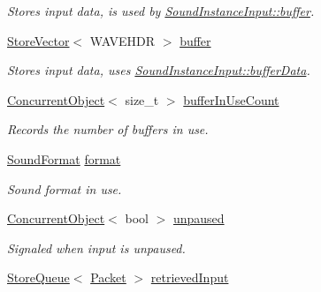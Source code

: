 \begin{DoxyCompactItemize}
\begin{DoxyCompactList}\small\item\em Stores input data, is used by \hyperlink{class_sound_instance_input_a07337eba668678c1483c679b8a702ab6}{SoundInstanceInput::buffer}. \item\end{DoxyCompactList}\item 
\hypertarget{class_sound_instance_input_a07337eba668678c1483c679b8a702ab6}{
\hyperlink{class_store_vector}{StoreVector}$<$ WAVEHDR $>$ \hyperlink{class_sound_instance_input_a07337eba668678c1483c679b8a702ab6}{buffer}}
\label{class_sound_instance_input_a07337eba668678c1483c679b8a702ab6}

\begin{DoxyCompactList}\small\item\em Stores input data, uses \hyperlink{class_sound_instance_input_a19cd80335b30e8eb06278725d10aa316}{SoundInstanceInput::bufferData}. \item\end{DoxyCompactList}\item 
\hyperlink{class_concurrent_object}{ConcurrentObject}$<$ size\_\-t $>$ \hyperlink{class_sound_instance_input_a6941c252472e5f25c8761d6850a95658}{bufferInUseCount}
\begin{DoxyCompactList}\small\item\em Records the number of buffers in use. \item\end{DoxyCompactList}\item 
\hypertarget{class_sound_instance_input_ab28bbe2734e18d0a3f6d9f65362efd78}{
\hyperlink{class_sound_format}{SoundFormat} \hyperlink{class_sound_instance_input_ab28bbe2734e18d0a3f6d9f65362efd78}{format}}
\label{class_sound_instance_input_ab28bbe2734e18d0a3f6d9f65362efd78}

\begin{DoxyCompactList}\small\item\em Sound format in use. \item\end{DoxyCompactList}\item 
\hypertarget{class_sound_instance_input_ae3aaba9fa3a2dfdfed79bd068bb2217a}{
\hyperlink{class_concurrent_object}{ConcurrentObject}$<$ bool $>$ \hyperlink{class_sound_instance_input_ae3aaba9fa3a2dfdfed79bd068bb2217a}{unpaused}}
\label{class_sound_instance_input_ae3aaba9fa3a2dfdfed79bd068bb2217a}

\begin{DoxyCompactList}\small\item\em Signaled when input is unpaused. \item\end{DoxyCompactList}\item 
\hypertarget{class_sound_instance_input_aaacbd273b8daafdd78b85ecefd7dff0b}{
\hyperlink{class_store_queue}{StoreQueue}$<$ \hyperlink{class_packet}{Packet} $>$ \hyperlink{class_sound_instance_input_aaacbd273b8daafdd78b85ecefd7dff0b}{retrievedInput}}
\label{class_sound_instance_input_aaacbd273b8daafdd78b85ecefd7dff0b}


\end{DoxyCompactItemize}
